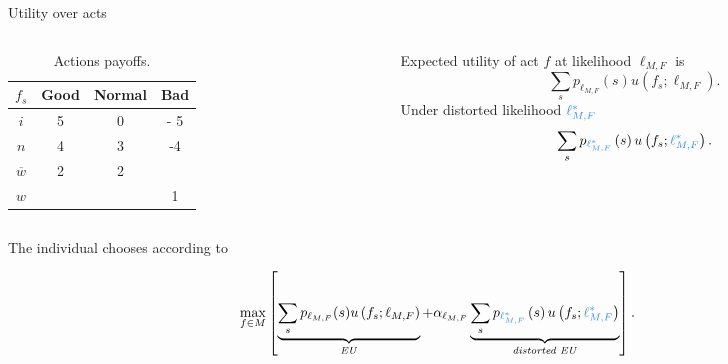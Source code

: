 \documentclass[usenames,dvipsnames,aspectratio=169,11pt, envcountsect, handout]{beamer}
\begin{document}
\begin{frame}{Utility over acts}

	\begin{columns}
		\begin{column}{0.45\textwidth}  %
			\begin{center}
				\begin{table}[H]
					\centering
					\begin{tabular}{c | c c c}
						\(  f_s \)         & Good & Normal & Bad \\
						\hline
						\( i \)            & 5    & 0      & - 5 \\
						\( n \)            & 4    & 3      & -4  \\
						\( \overline{w} \) & 2    & 2      &     \\
						\( w \)            &      &        & 1   \\
					\end{tabular}
					\caption{Actions payoffs.}
					\label{tab:utility1}
				\end{table}
			\end{center}
		\end{column}

		\begin{column}{0.55\textwidth}  %
			Expected utility of act \( f \) at likelihood \( \ell_{M, F} \) is
			\vfill
			\[
				\sum_{s} p_{\ell_{M, F}} \left( s \right) u \left( f_{s} ; \ell_{M, F} \right) .
			\] \pause
			\vfill
			Under distorted likelihood \( \textcolor{blue}{\ell^{*}_{M,F}} \)
			\vfill
			\[
				\sum_{s} p_{\textcolor{blue}{\ell^{*}_{M, F}}} \left( s \right) u \left( f_{s} ; \textcolor{blue}{\ell^{*}_{M, F}} \right).
			\] \pause
		\end{column}
	\end{columns}

	\vfill

	The individual chooses according to

	\vfill

	\[
		\max _{f \in M} \left[ \underbrace{\sum_{s} p_{\ell_{M, F}}(s) u \left( f_{s}; \ell_{M, F} \right)}_{\text{\textit{EU}}} +
			\alpha_{\ell_{M, F}} \underbrace{\sum_{s} p_{\textcolor{blue}{\ell^{*}_{M, F}}} \left( s \right) u \left( f_{s} ; \textcolor{blue}{\ell^{*}_{M, F}} \right)}_{\text{\textit{distorted EU}}} \right] .
	\]

\end{frame}
\end{document}
